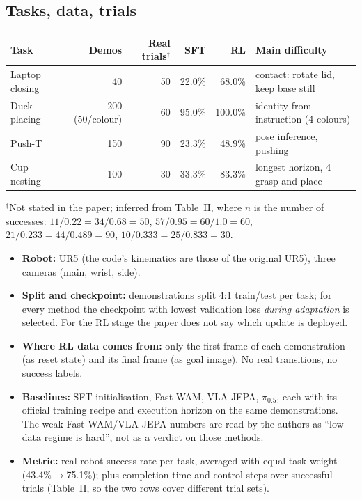 \subsection{Tasks, data, trials}
\begin{center}
\small
\begin{tabular}{@{}lrrrrl@{}}
\toprule
Task & Demos & Real trials$^\dagger$ & SFT & RL & Main difficulty\\
\midrule
Laptop closing & 40 & 50 & 22.0\% & 68.0\% & contact: rotate lid, keep base still\\
Duck placing & 200 (50/colour) & 60 & 95.0\% & 100.0\% & identity from instruction (4 colours)\\
Push-T & 150 & 90 & 23.3\% & 48.9\% & pose inference, pushing\\
Cup nesting & 100 & 30 & 33.3\% & 83.3\% & longest horizon, 4 grasp-and-place\\
\bottomrule
\end{tabular}

\smallskip
{\footnotesize $^\dagger$Not stated in the paper; inferred from Table~II, where $n$ is the number of successes: $11/0.22=34/0.68=50$, $57/0.95=60/1.0=60$, $21/0.233=44/0.489=90$, $10/0.333=25/0.833=30$.}
\end{center}

\begin{itemize}
\item \textbf{Robot:} UR5 (the code's kinematics are those of the original UR5), three cameras (main, wrist, side).
\item \textbf{Split and checkpoint:} demonstrations split 4:1 train/test per task; for every method the checkpoint with lowest validation loss \emph{during adaptation} is selected. For the RL stage the paper does not say which update is deployed.
\item \textbf{Where RL data comes from:} only the first frame of each demonstration (as reset state) and its final frame (as goal image). No real transitions, no success labels.
\item \textbf{Baselines:} SFT initialisation, Fast-WAM, VLA-JEPA, $\pi_{0.5}$, each with its official training recipe and execution horizon on the same demonstrations. The weak Fast-WAM/VLA-JEPA numbers are read by the authors as ``low-data regime is hard'', not as a verdict on those methods.
\item \textbf{Metric:} real-robot success rate per task, averaged with equal task weight (43.4\%$\to$75.1\%); plus completion time and control steps over successful trials (Table~II, so the two rows cover different trial sets).
\end{itemize}


